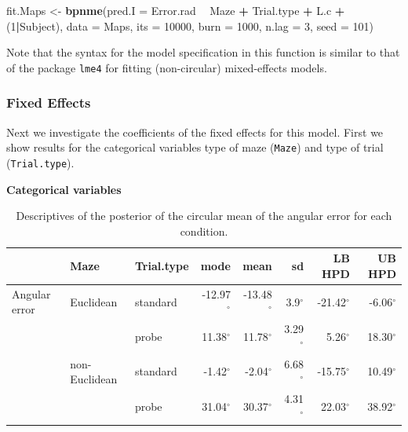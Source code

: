 \documentclass[11pt,]{article}
\newenvironment{Shaded}{\begin{snugshade}}{\end{snugshade}}
\newcommand{\DataTypeTok}[1]{\textcolor[rgb]{0.13,0.29,0.53}{#1}}
\newcommand{\DecValTok}[1]{\textcolor[rgb]{0.00,0.00,0.81}{#1}}
\newcommand{\KeywordTok}[1]{\textcolor[rgb]{0.13,0.29,0.53}{\textbf{#1}}}
\newcommand{\NormalTok}[1]{#1}
\newcommand{\OperatorTok}[1]{\textcolor[rgb]{0.81,0.36,0.00}{\textbf{#1}}}
\newcommand{\StringTok}[1]{\textcolor[rgb]{0.31,0.60,0.02}{#1}}
\begin{document}
\begin{Shaded}
\begin{Highlighting}[]
\NormalTok{fit.Maps <-}\StringTok{ }\KeywordTok{bpnme}\NormalTok{(}\DataTypeTok{pred.I =}\NormalTok{ Error.rad }\OperatorTok{~}\StringTok{ }\NormalTok{Maze }\OperatorTok{+}\StringTok{ }\NormalTok{Trial.type }\OperatorTok{+}\StringTok{ }\NormalTok{L.c }\OperatorTok{+}\StringTok{ }\NormalTok{(}\DecValTok{1}\OperatorTok{|}\NormalTok{Subject),}
                  \DataTypeTok{data =}\NormalTok{ Maps,}
                  \DataTypeTok{its =} \DecValTok{10000}\NormalTok{, }\DataTypeTok{burn =} \DecValTok{1000}\NormalTok{, }\DataTypeTok{n.lag =} \DecValTok{3}\NormalTok{, }\DataTypeTok{seed =} \DecValTok{101}\NormalTok{)}
\end{Highlighting}
\end{Shaded}

Note that the syntax for the model specification in this function is
similar to that of the package \verb|lme4| for fitting (non-circular)
mixed-effects models.

\subsubsection{Fixed Effects}\label{fixme}

Next we investigate the coefficients of the fixed effects for this
model. First we show results for the categorical variables type of maze
(\verb|Maze|) and type of trial (\verb|Trial.type|).

\textbf{Categorical variables}

\begin{table}
\centering
\caption{Descriptives of the posterior of the circular mean of the angular error for each condition.} 
\begin{tabular}{lllrrrrr}
  \hline\noalign{\smallskip}
& Maze & Trial.type & mode & mean & sd & LB HPD & UB HPD  \\ \hline\noalign{\smallskip}
Angular error   & Euclidean     & standard & -12.97$^{\circ}$ & -13.48$^{\circ}$ & 3.9$^{\circ}$ & -21.42$^{\circ}$ & -6.06$^{\circ}$\\
              &                   & probe    &  11.38$^{\circ}$ & 11.78$^{\circ}$ & 3.29$^{\circ}$ & 5.26$^{\circ}$ & 18.30$^{\circ}$   \\
                & non-Euclidean & standard & -1.42$^{\circ}$  & -2.04$^{\circ}$  & 6.68$^{\circ}$ & -15.75$^{\circ}$ & 10.49$^{\circ}$ \\
              &                   & probe    &  31.04$^{\circ}$ & 30.37$^{\circ}$ & 4.31$^{\circ}$ & 22.03$^{\circ}$ & 38.92$^{\circ}$ \\
   \hline
\end{tabular}
\label{TableResMaps}
\end{table}
\end{document}

